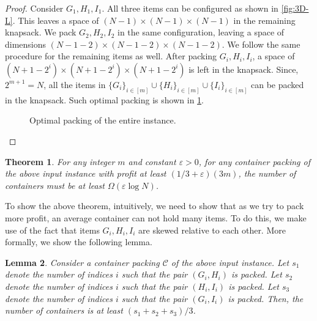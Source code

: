 \documentclass[10pt,a4paper]{amsart}
\newcommand{\eps}{\varepsilon}
\newtheorem{theorem}{Theorem}[section]
\newtheorem{lemma}[theorem]{Lemma}
\theoremstyle{definition}
\begin{document}
\begin{proof}
    Consider $G_1,H_1,I_1$. All three items can be configured as shown in \cref{fig:3D-L}. This leaves a space of $(N-1)\times (N-1)\times (N-1)$
    in the remaining knapsack.
    We pack $G_2,H_2,I_2$ in the same configuration, leaving a space of dimensions $(N-1-2)\times (N-1-2)\times (N-1-2)$.
    We follow the same procedure for the remaining items as well. After packing $G_i,H_i,I_i$, a space of $(N+1-2^i)\times (N+1-2^i)\times (N+1-2^i)$ is left in the knapsack.
    Since, $2^{m+1}=N$, all the items in $\{G_i\}_{i\in[m]}\cup\{H_i\}_{i\in[m]}\cup\{I_i\}_{i\in[m]}$
    can be packed in the knapsack. Such optimal packing is shown in \cref{fig:opt-hardness}.
    \begin{figure}
        \centering
        \begin{minipage}{0.45\textwidth}
            \centering
            \caption{Packing $G_1,H_1,I_1$.}
            \label{fig:3D-L}
        \end{minipage}\hfill
        \begin{minipage}{0.45\textwidth}
            \centering
            \caption{Optimal packing of the entire instance.}
            \label{fig:opt-hardness}
        \end{minipage}
    \end{figure}
\end{proof}
\begin{theorem}
\label{thm:hardness}
    For any integer $m$ and constant $\eps>0$, for any container packing of the above input instance with profit at least $(1/3+\eps)(3m)$, the number of containers must be at least $\Omega(\eps\log N)$.
\end{theorem}
To show the above theorem, intuitively, we need to show that as we try to pack more profit, an average container can not hold many items.
To do this, we make use of the fact that items $G_i, H_i, I_i$ are skewed relative to each other. More formally, we show the following lemma.
\begin{lemma}
\label{lem:hardness}
    Consider a container packing $\mathcal C$ of the above input instance. Let $s_1$ denote the number of indices $i$ such that the pair $(G_i,H_i)$ is packed.
    Let $s_2$ denote the number of indices $i$ such that the pair $(H_i,I_i)$ is packed.
    Let $s_3$ denote the number of indices $i$ such that the pair $(G_i,I_i)$ is packed.
    Then, the number of containers is at least $(s_1+s_2+s_3)/3$.
\end{lemma}
\end{document}
